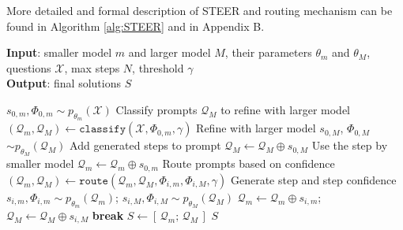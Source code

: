 \documentclass[letterpaper]{article} %
\begin{document}
\noindent More detailed and formal description of STEER and routing mechanism can be found in Algorithm \ref{alg:STEER} and in Appendix B.

% 
\begin{algorithm}[tb]
\caption{\textsc{STEER}}
\label{alg:STEER}
\textbf{Input}: smaller model $m$ and larger model $M$, their parameters $\theta_m$ and $\theta_M$, questions $\mathcal{X}$, max steps $N$, threshold $\gamma$\\
\textbf{Output}: final solutions $S$
\begin{algorithmic}[1]
    \STATE {} $s_{0,m},\Phi_{0, m}\sim p_{\theta_m}(\mathcal{X})$
    \STATE Classify prompts $\mathcal{Q}_M$ to refine with larger model \\ \hfill $(\mathcal{Q}_m,\mathcal{Q}_M)\gets\texttt{classify}(\mathcal{X},{\Phi}_{0,m},\gamma)$
            \STATE Refine with larger model $s_{0,M}$, $\Phi_{0,M}$ $\sim p_{\theta_M}(\mathcal{Q}_M)$
            \STATE Add generated steps to prompt $\mathcal{Q}_M \leftarrow \mathcal{Q}_M \oplus s_{0,M}$
        \ELSE
            \STATE Use the step by smaller model $\mathcal{Q}_m \leftarrow \mathcal{Q}_m \oplus s_{0,m}$ 
        \ENDIF
    \ENDFOR
        \STATE Route prompts based on confidence \\ \hfill $(\mathcal{Q}_m,\mathcal{Q}_M)\gets\texttt{route}(\mathcal{Q}_m,\mathcal{Q}_M,{\Phi}_{i,m},{\Phi}_{i,M},\gamma)$
        \STATE Generate step and step confidence \\ \hfill
        $s_{i,m}, \Phi_{i,m} \sim p_{\theta_m}(\mathcal{Q}_m)$;
        $s_{i,M}, \Phi_{i,M} \sim p_{\theta_M}(\mathcal{Q}_M)$
        \STATE $\mathcal{Q}_m \leftarrow \mathcal{Q}_m \oplus s_{i,m}$;\quad
               $\mathcal{Q}_M \leftarrow \mathcal{Q}_M \oplus s_{i,M}$
            \STATE \textbf{break}
        \ENDIF
    \ENDFOR
    \STATE $S \leftarrow [\,\mathcal{Q}_m;\,\mathcal{Q}_M\,]$
    \RETURN $S$
\end{algorithmic}
\end{algorithm}

% 
\end{document}
